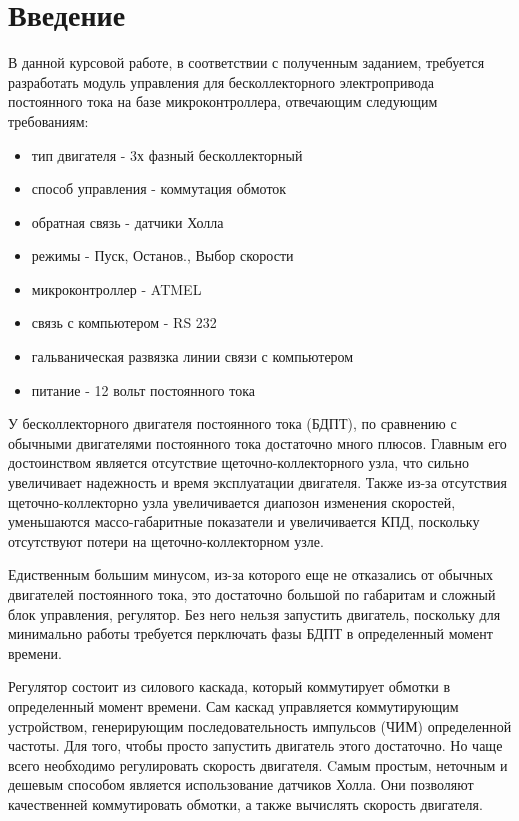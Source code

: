 \documentclass[russian, utf8]{eskdtext}
\begin{document}
\tableofcontents
\thispagestyle{empty}
\newpage

{\section*{Введение}
}

В данной курсовой работе, в соответствии с полученным заданием, требуется разработать модуль управления для бесколлекторного электропривода постоянного тока на базе микроконтроллера, отвечающим следующим требованиям: 
\begin{itemize}
	\item тип двигателя - 3х фазный бесколлекторный
	\item способ управления - коммутация обмоток
	\item обратная связь - датчики Холла
	\item режимы - Пуск, Останов., Выбор скорости
	\item микроконтроллер - ATMEL
	\item связь с компьютером - RS 232
	\item гальваническая развязка линии связи с компьютером
	\item питание - 12 вольт постоянного тока
\end{itemize} \par
У бесколлекторного двигателя постоянного тока (БДПТ), по сравнению с обычными двигателями постоянного тока достаточно много плюсов. Главным его достоинством является отсутствие щеточно-коллекторного узла, что сильно увеличивает надежность и время эксплуатации двигателя. Также из-за отсутствия щеточно-коллекторно узла увеличивается диапозон изменения скоростей, уменьшаются массо-габаритные показатели и увеличивается КПД, поскольку отсутствуют потери на щеточно-коллекторном узле. \par

Едиственным большим минусом, из-за которого еще не отказались от обычных двигателей постоянного тока, это достаточно большой по габаритам и сложный блок управления, регулятор. Без него нельзя запустить двигатель, поскольку для минимально работы требуется перключать фазы БДПТ в определенный момент времени.\par

Регулятор состоит из силового каскада, который коммутирует обмотки в определенный момент времени. Сам каскад управляется коммутирующим устройством, генерирующим последовательность импульсов (ЧИМ) определенной частоты. Для того, чтобы просто запустить двигатель этого достаточно. Но чаще всего необходимо регулировать скорость двигателя. Cамым простым, неточным и дешевым способом является использование датчиков Холла. Они позволяют качественней коммутировать обмотки, а также вычислять скорость двигателя. \par
\end{document}
